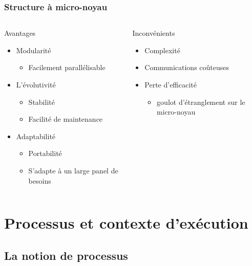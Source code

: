 \begin{frame}
\frametitle{Structure à micro-noyau}
\begin{columns}
\begin{block}{Avantages}
\begin{itemize}
\item Modularité
\begin{itemize}
\item Facilement parallélisable
\end{itemize}
\item L'évolutivité
\begin{itemize}
\item Stabilité
\item Facilité de maintenance
\end{itemize}
\item Adaptabilité
\begin{itemize}
\item Portabilité
\item S'adapte à un large panel de besoins
\end{itemize}
\end{itemize}
\end{block}
\begin{block}{Inconvénients}
\begin{itemize}
\item Complexité
\item Communications coûteuses
\item Perte d'efficacité
\begin{itemize}
\item goulot d'étranglement sur le micro-noyau
\end{itemize}
\end{itemize}
\end{block}
\end{columns}
\end{frame}



\section{Processus et contexte d'exécution}
\subsection{La notion de processus}

